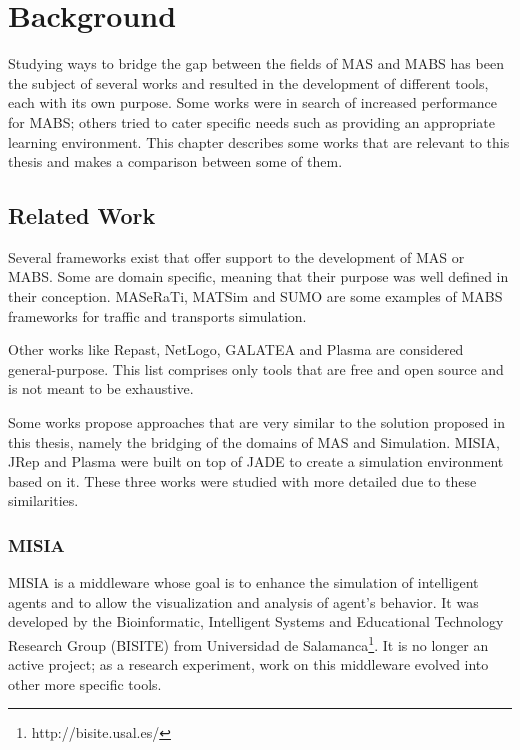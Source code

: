 \chapter{Background}
\label{chap:background}


Studying ways to bridge the gap between the fields of MAS and MABS has been the subject of several works and resulted in the development of different tools, each with its own purpose. Some works were in search of increased performance for MABS; others tried to cater specific needs such as providing an appropriate learning environment. This chapter describes some works that are relevant to this thesis and makes a comparison between some of them.

\section{Related Work}
Several frameworks exist that offer support to the development of MAS or MABS. Some are domain specific, meaning that their purpose was well defined in their conception. MASeRaTi\cite{ahlbrecht2014scalable}, MATSim\cite{balmer2008agent} and SUMO\cite{SUMO2012} are some examples of MABS frameworks for traffic and transports simulation. 

Other works like Repast\cite{collier2003repast}, NetLogo\cite{tisue2004netlogo}, GALATEA\cite{davila2000galatea} and Plasma\cite{warden2010towards} are considered general-purpose. This list comprises only tools that are free and open source and is not meant to be exhaustive. 

Some works propose approaches that are very similar to the solution proposed in this thesis, namely the bridging of the domains of MAS and Simulation. MISIA, JRep and Plasma were built on top of JADE to create a simulation environment based on it. These three works were studied with more detailed due to these similarities.

\subsection{MISIA}
MISIA is a middleware whose goal is to enhance the simulation of intelligent agents and to allow the visualization and analysis of agent's behavior. It was developed by the Bioinformatic, Intelligent Systems and Educational Technology Research Group (BISITE) from Universidad de Salamanca\footnote{http://bisite.usal.es/}. It is no longer an active project; as a research experiment, work on this middleware evolved into other more specific tools.

